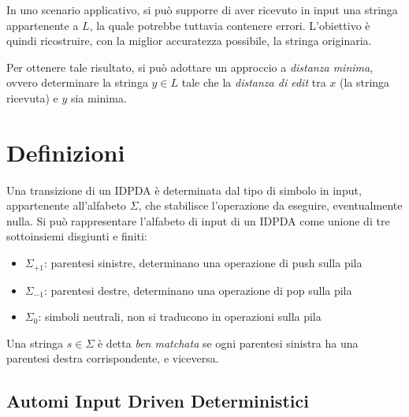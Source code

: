 \documentclass[a4paper,12pt]{report}
\begin{document}
    In uno scenario applicativo, si può supporre di aver ricevuto in input una stringa appartenente a $L$, la quale potrebbe tuttavia contenere errori. L'obiettivo è quindi ricostruire, con la miglior accuratezza possibile, la stringa originaria.

    Per ottenere tale risultato, si può adottare un approccio a \emph{distanza minima}, ovvero determinare la stringa $y \in L$ tale che la \textit{distanza di edit} tra $x$ (la stringa ricevuta) e $y$ sia minima.

    \chapter{Definizioni}
    Una transizione di un IDPDA è determinata dal tipo di simbolo in input, appartenente all'alfabeto $\Sigma$, che stabilisce l'operazione da eseguire, eventualmente nulla.
    Si può rappresentare l'alfabeto di input di un IDPDA come unione di tre sottoinsiemi disgiunti e finiti:

    \begin{itemize}
        \item $\Sigma_{+1}$: parentesi sinistre, determinano una operazione di push sulla pila
        \item $\Sigma_{-1}$: parentesi destre, determinano una operazione di pop sulla pila
        \item $\Sigma_{0}$: simboli neutrali, non si traducono in operazioni sulla pila
    \end{itemize}

    Una stringa $s \in \Sigma$ è detta \textit{ben matchata} se ogni parentesi sinistra ha una parentesi destra corrispondente, e viceversa.

    \section{Automi Input Driven Deterministici}
\end{document}
